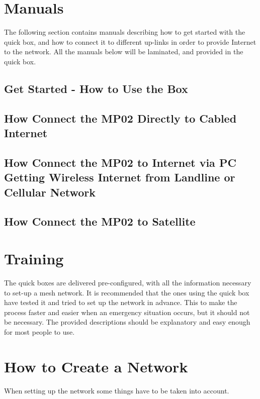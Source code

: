 \section{Manuals}
The following section contains manuals describing how to get started with the \gls{quick} box, and how to connect it to different up-links in order to provide Internet to the network. All the manuals below will be laminated, and provided in the \gls{quick} box. 

\subsection{Get Started - How to Use the Box}


\subsection{How Connect the MP02 Directly to Cabled Internet}
\label{subsec:cabledInternet}


\subsection{How Connect the MP02 to Internet via PC Getting Wireless Internet from Landline or Cellular Network}
\label{subsec:internetviaPC}

 


\subsection{How Connect the MP02 to Satellite}


\section{Training}
The \gls{quick} boxes are delivered pre-configured, with all the  information necessary to set-up a mesh network. It is recommended that the ones using the \gls{quick} box have tested it and tried to set up the network in advance. This to make the process faster and easier when an emergency situation occurs, but it should not be necessary. The provided descriptions should be explanatory and easy enough for most people to use.


\section{How to Create a Network}
When setting up the network some things have to be taken into account. 

